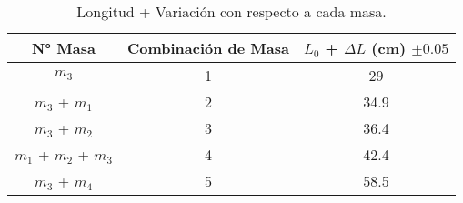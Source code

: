 \documentclass[../main.tex]{subfiles}
\begin{document}
\begin{table}[H]
    \centering
    \begin{tabular}{ccc}
        \toprule
        N° Masa & Combinación de Masa & $L_0$ + $\Delta L$ (\unit{\centi\metre}) $\pm \num{0.05}$\\
        \midrule
        $m_3$                 & \num{1} & \num{29} \\
        $m_3$ + $m_1$         & \num{2} & \num{34.9} \\
        $m_3$ + $m_2$         & \num{3} & \num{36.4} \\
        $m_1$ + $m_2$ + $m_3$ & \num{4} & \num{42.4} \\
        $m_3$ + $m_4$         & \num{5} & \num{58.5} \\
        \bottomrule
    \end{tabular}
    \caption{Longitud + Variación con respecto a cada masa.}
\end{table}
\end{document}
